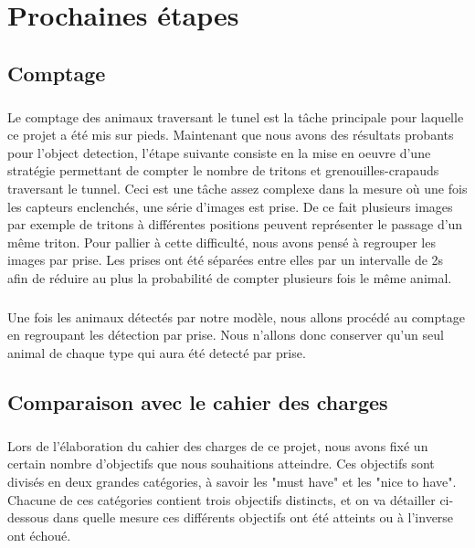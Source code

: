 \chapter{Prochaines étapes}
\section{Comptage}\label{anal:comptage}
\paragraph{} Le comptage des animaux traversant le tunel est la tâche principale pour laquelle ce projet a été mis sur pieds. Maintenant que nous avons des résultats probants pour l'object detection, l'étape suivante consiste en la mise en oeuvre d'une stratégie permettant de compter le nombre de tritons et grenouilles-crapauds traversant le tunnel. Ceci est une tâche assez complexe dans la mesure où une fois les capteurs enclenchés, une série d'images est prise. De ce fait plusieurs images par exemple de tritons à différentes positions peuvent représenter le passage d'un même triton. Pour pallier à cette difficulté, nous avons pensé à regrouper les images par prise. Les prises ont été séparées entre elles par un intervalle de 2s afin de réduire au plus la probabilité de compter plusieurs fois le même animal. 

\paragraph{} Une fois les animaux détectés par notre modèle, nous allons procédé au comptage en regroupant les détection par prise. Nous n'allons donc conserver qu'un seul animal de chaque type qui aura été detecté par prise. 

\section{Comparaison avec le cahier des charges}

\paragraph{} Lors de l'élaboration du cahier des charges de ce projet, nous avons fixé un certain nombre d'objectifs que nous souhaitions atteindre. Ces objectifs sont divisés en deux grandes catégories, à savoir les "must have" et les "nice to have". Chacune de ces catégories contient trois objectifs distincts, et on va détailler ci-dessous dans quelle mesure ces différents objectifs ont été atteints ou à l'inverse ont échoué.

